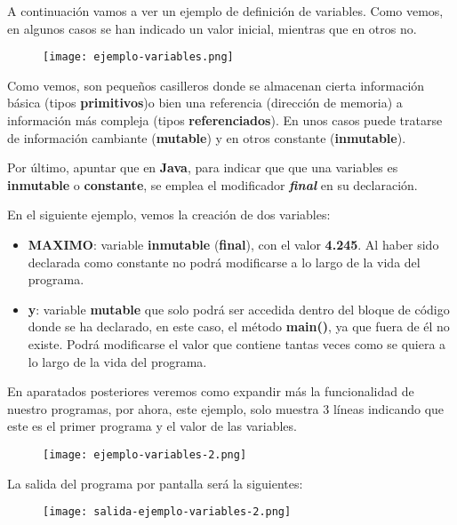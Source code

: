 A continuación vamos a ver un ejemplo de definición de variables. Como vemos, en algunos casos se han indicado un valor inicial, mientras que en otros no.

\begin{figure}[H]
    \centering
    \texttt{[image: ejemplo-variables.png]}
\end{figure}

Como vemos, son pequeños casilleros donde se almacenan cierta información básica (tipos \textbf{primitivos})o bien una referencia (dirección de memoria) a información más compleja (tipos \textbf{referenciados}). En unos casos puede tratarse de información cambiante (\textbf{mutable}) y en otros constante (\textbf{inmutable}).

Por último, apuntar que en \textbf{Java}, para indicar que que una variables es \textbf{inmutable} o \textbf{constante}, se emplea el modificador \textbf{\textit{final}} en su declaración.

En el siguiente ejemplo, vemos la creación de dos variables:

\begin{itemize}
    \item \textbf{MAXIMO}: variable \textbf{inmutable} (\textbf{final}), con el valor \textbf{4.245}. Al haber sido declarada como constante no podrá modificarse a lo largo de la vida del programa.

    \item \textbf{y}: variable \textbf{mutable} que solo podrá ser accedida dentro del bloque de código donde se ha declarado, en este caso, el método \textbf{main()}, ya que fuera de él no existe. Podrá modificarse el valor que contiene tantas veces como se quiera a lo largo de la vida del programa.
\end{itemize}

En aparatados posteriores veremos como expandir más la funcionalidad de nuestro programas, por ahora, este ejemplo, solo muestra 3 líneas indicando que este es el primer programa y el valor de las variables.

\begin{figure}[H]
    \texttt{[image: ejemplo-variables-2.png]}
\end{figure}

La salida del programa por pantalla será la siguientes:

\begin{figure}[H]
    \texttt{[image: salida-ejemplo-variables-2.png]}
\end{figure}

